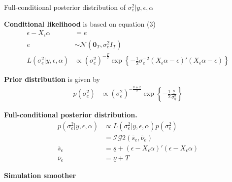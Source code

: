 \documentclass[notes,blackandwhite,mathsans,usenames,dvipsnames]{beamer}
\begin{document}
\begin{frame}{Full-conditional posterior distribution of $\sigma^2_e|y,\epsilon,\alpha$}

\small
\bigskip\textbf{Conditional likelihood} {\color{mcxs2}is based on equation} (3)
\begin{align*}
\epsilon-X_\epsilon \alpha &=e\\
e  &\sim\mathcal{N}\left(\mathbf{0}_T, \sigma^2_e I_T\right)\\
L\left(\sigma^2_e|y,\epsilon,\alpha\right)&\propto \left(\sigma^2_e\right)^{-\frac{T}{2}}\exp\left\{-\frac{1}{2}\sigma^{-2}_e\left(X_\epsilon \alpha-\epsilon\right)'\left(X_\epsilon \alpha-\epsilon\right)  \right\}
\end{align*}

\smallskip\textbf{Prior distribution} is given by
\begin{align*}
p\left(\sigma^2_e\right)&\propto\left(\sigma^2_e\right)^{-\frac{\underline{\nu}+2}{2}} \exp\left\{ -\frac{1}{2}\frac{\underline{s}}{\sigma^2_\eta} \right\}
\end{align*}

\smallskip\textbf{Full-conditional posterior distribution.}
\begin{align*}
p\left( \sigma^2_e|y,\epsilon,\alpha \right) &\propto L\left(\sigma^2_e|y,\epsilon,\alpha\right)p\left(\sigma^2_e\right)\\
&= \mathcal{IG}2\left(\overline{s}_e,\overline{\nu}_e\right)\\
\overline{s}_e &= \underline{s} + (\epsilon-X_\epsilon \alpha)'(\epsilon-X_\epsilon \alpha)\\
\overline{\nu}_e &= \underline{\nu} + T
\end{align*}

\end{frame}








{
\begin{frame}

\begin{adjustwidth}{-0.5cm}{0cm}
\vspace{8.3cm}\Large
\textbf{{\color{mcxs2}Simulation} {\color{mcxs1}smoother}}
\end{adjustwidth}

\end{frame}
}
\end{document}
